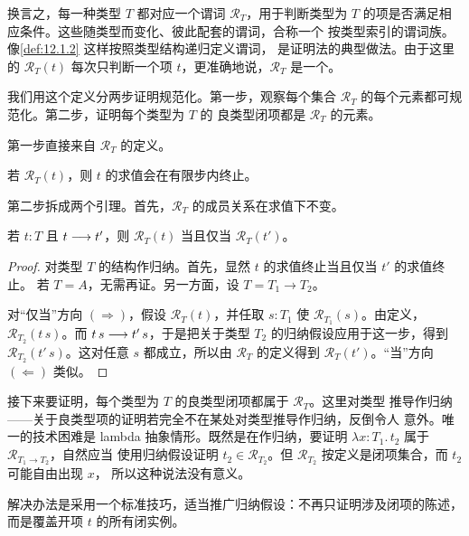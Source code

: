 换言之，每一种类型 \(T\) 都对应一个谓词 \(\mathcal R_T\)，用于判断类型为
\(T\) 的项是否满足相应条件。这些随类型而变化、彼此配套的谓词，合称一个
按类型索引的谓词族。像\cref{def:12.1.2} 这样按照类型结构递归定义谓词，
是证明法的典型做法。由于这里的
\(\mathcal R_T(t)\) 每次只判断一个项 \(t\)，更准确地说，\(\mathcal R_T\)
是一个。

我们用这个定义分两步证明规范化。第一步，观察每个集合
\(\mathcal R_T\) 的每个元素都可规范化。第二步，证明每个类型为 \(T\) 的
良类型闭项都是 \(\mathcal R_T\) 的元素。

第一步直接来自 \(\mathcal R_T\) 的定义。

\begin{lemma}
\label{lem:12.1.3}
若 \(\mathcal R_T(t)\)，则 \(t\) 的求值会在有限步内终止。
\end{lemma}

第二步拆成两个引理。首先，\(\mathcal R_T\) 的成员关系在求值下不变。

\begin{lemma}
\label{lem:12.1.4}
若 \(t:T\) 且 \(t\mathrel{\longrightarrow} t'\)，则
\(\mathcal R_T(t)\) 当且仅当 \(\mathcal R_T(t')\)。
\end{lemma}

\begin{proof}
对类型 \(T\) 的结构作归纳。首先，显然 \(t\) 的求值终止当且仅当
\(t'\) 的求值终止。
若 \(T=A\)，无需再证。另一方面，设 \(T=T_1\to T_2\)。

对“仅当”方向 \((\Rightarrow)\)，假设 \(\mathcal R_T(t)\)，并任取
\(s:T_1\) 使 \(\mathcal R_{T_1}(s)\)。由定义，
\(\mathcal R_{T_2}(t\,s)\)。而 \(t\,s\mathrel{\longrightarrow} t'\,s\)，于是把关于类型
\(T_2\) 的归纳假设应用于这一步，得到
\(\mathcal R_{T_2}(t'\,s)\)。这对任意 \(s\) 都成立，所以由
\(\mathcal R_T\) 的定义得到 \(\mathcal R_T(t')\)。“当”方向
\((\Leftarrow)\) 类似。
\end{proof}

接下来要证明，每个类型为 \(T\) 的良类型闭项都属于 \(\mathcal R_T\)。这里对类型
推导作归纳——关于良类型项的证明若完全不在某处对类型推导作归纳，反倒令人
意外。唯一的技术困难是 lambda 抽象情形。既然是在作归纳，要证明
\(\lambda x:T_1.\,t_2\) 属于 \(\mathcal R_{T_1\to T_2}\)，自然应当
使用归纳假设证明 \(t_2\in\mathcal R_{T_2}\)。但
\(\mathcal R_{T_2}\) 按定义是闭项集合，而 \(t_2\) 可能自由出现 \(x\)，
所以这种说法没有意义。

解决办法是采用一个标准技巧，适当推广归纳假设：不再只证明涉及闭项的陈述，
而是覆盖开项 \(t\) 的所有闭实例。


